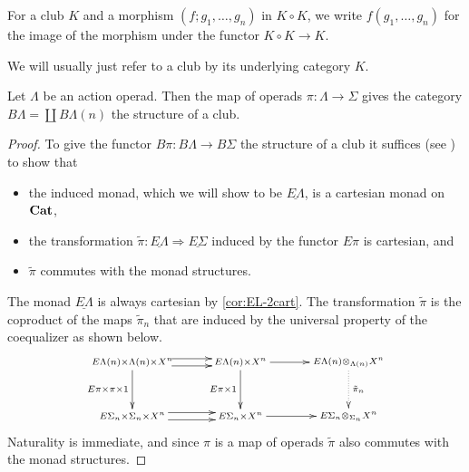 \begin{nota}\label{nota:clubmult}
For a club $K$ and a morphism $(f; g_{1}, \ldots, g_{n})$ in $K \circ K$, we write $f(g_{1}, \ldots, g_{n})$ for the image of the morphism under the functor $K \circ K \rightarrow K$.
\end{nota}

We will usually just refer to a club by its underlying category $K$.


\begin{thm}
Let $\Lambda$ be an action operad. Then the map of operads $\pi \colon \Lambda \rightarrow \Sigma$ gives the category $B\Lambda = \coprod B\Lambda(n)$ the structure of a club.
\end{thm}
\begin{proof}


To give the functor $B\pi \colon B\Lambda \rightarrow B \Sigma$ the structure of a club it suffices (see \cite{leinster}) to show that
\begin{itemize}
\item the induced monad, which we will show to be $\underline{E\Lambda}$, is a cartesian monad on $\mathbf{Cat}$,
\item the transformation $\tilde{\pi} \colon \underline{E\Lambda} \Rightarrow \underline{E\Sigma}$ induced by the functor $E\pi$ is cartesian, and
\item $\tilde{\pi}$ commutes with the monad structures.
\end{itemize}
The monad $\underline{E\Lambda}$ is always cartesian by \cref{cor:EL-2cart}. The transformation $\tilde{\pi}$ is the coproduct of the maps $\tilde{\pi}_{n}$ that are induced by the universal property of the coequalizer as shown below.
  \[
    \xy
      (0,0)*+{\scriptstyle E\Lambda(n) \times \Lambda(n) \times X^n} ="00";
      (0,-15)*+{\scriptstyle E\Sigma_{n} \times \Sigma_{n} \times X^n} ="01";
      (30,0)*+{\scriptstyle E\Lambda(n) \times X^n} ="10";
      (30,-15)*+{\scriptstyle E\Sigma_{n} \times X^n} ="11";
      (60,0)*+{\scriptstyle E\Lambda(n) \otimes_{\Lambda(n)} X^n} ="20";
      (60,-15)*+{\scriptstyle E\Sigma_{n} \otimes_{\Sigma_{n}}  X^n} ="21";
      {\ar (11,1)*{}; (22,1)*{} };
      {\ar (11,-1)*{}; (22,-1)*{} };
      {\ar_{E\pi \times \pi \times 1} "00" ; "01"};
      {\ar (10,-14)*{}; (23,-14)*{} };
      {\ar (10,-16)*{}; (23,-16)*{} };
      {\ar_{E\pi \times 1} "10" ; "11"};
      {\ar@{.>}^{\tilde{\pi}_{n}} "20" ; "21"};
      {\ar "10" ; "20"};
      {\ar "11" ; "21"};
    \endxy
  \]
Naturality is immediate, and since $\pi$ is a map of operads $\tilde{\pi}$ also commutes with the monad structures.


\end{proof}
